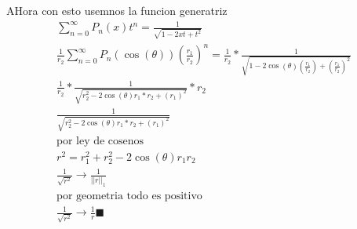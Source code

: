     \begin{mdframed}
    \begin{center}
    \end{center}
    AHora con esto usemnos la funcion generatriz
    \begin{gather*}
        \sum_{n=0}^{\infty}P_n(x)t^n = \frac{1}{\sqrt{1-2xt+t^2}}\\
        \frac{1}{r_2}\sum_{n=0}^{\infty}P_n(\cos(\theta))\left(\frac{r_1}{r_2}\right)^n =\frac{1}{r_2}* \frac{1}{\sqrt{1-2\cos(\theta)\left(\frac{r_1}{r_2}\right)+\left(\frac{r_1}{r_2}\right)^2}}\\
        \frac{1}{r_2}*\frac{1}{\sqrt{r_2^2-2\cos(\theta)r_1*r_2+\left({r_1}\right)^2}}*r_2\\
        \frac{1}{\sqrt{r_2^2-2\cos(\theta)r_1*r_2+\left({r_1}\right)^2}}\\
        \text{por ley de cosenos}\\
        r^2=r_1^2+r_2^2-2\cos(\theta)r_1r_2\\
        \frac{1}{\sqrt{r^2}}\longrightarrow\frac{1}{||r||_1}\\
        \text{por geometria todo es positivo}\\
        \frac{1}{\sqrt{r^2}}\longrightarrow\frac{1}{r} \blacksquare
    \end{gather*}

    \end{mdframed}


